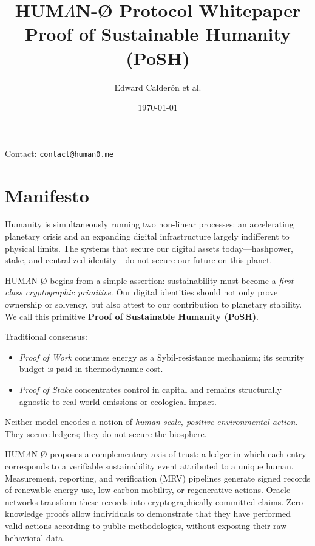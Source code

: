\documentclass[11pt,a4paper]{report}
\title{HUM{\Large$\Lambda$}N-Ø Protocol Whitepaper\\[4pt]
       \large Proof of Sustainable Humanity (PoSH)}
\author{Edward Calderón et al.}
\date{\today}
\theoremstyle{definition}
\theoremstyle{remark}
\begin{document}
\maketitle

\begin{center}
  Contact: \texttt{contact@human0.me}
\end{center}

\tableofcontents
\clearpage


\chapter*{Manifesto}

Humanity is simultaneously running two non-linear processes: an accelerating
planetary crisis and an expanding digital infrastructure largely indifferent to
physical limits. The systems that secure our digital assets today---hashpower,
stake, and centralized identity---do not secure our future on this planet.

HUM{\Large$\Lambda$}N-Ø begins from a simple assertion: sustainability must
become a \emph{first-class cryptographic primitive}. Our digital identities
should not only prove ownership or solvency, but also attest to our contribution
to planetary stability. We call this primitive \textbf{Proof of Sustainable
Humanity (PoSH)}.

Traditional consensus:

\begin{itemize}[leftmargin=*]
  \item \emph{Proof of Work} consumes energy as a Sybil-resistance mechanism;
        its security budget is paid in thermodynamic cost.
  \item \emph{Proof of Stake} concentrates control in capital and remains
        structurally agnostic to real-world emissions or ecological impact.
\end{itemize}

Neither model encodes a notion of \emph{human-scale, positive environmental
action}. They secure ledgers; they do not secure the biosphere.

HUM{\Large$\Lambda$}N-Ø proposes a complementary axis of trust: a ledger in
which each entry corresponds to a verifiable sustainability event attributed to
a unique human. Measurement, reporting, and verification (MRV) pipelines
generate signed records of renewable energy use, low-carbon mobility, or
regenerative actions. Oracle networks transform these records into
cryptographically committed claims. Zero-knowledge proofs \cite{GMR85} allow individuals to
demonstrate that they have performed valid actions according to public
methodologies, without exposing their raw behavioral data.
\end{document}

